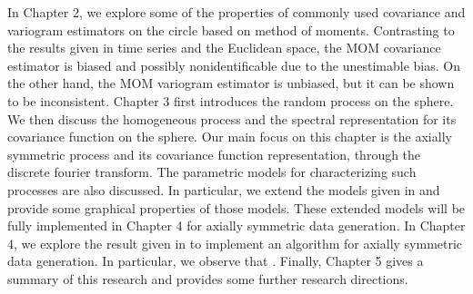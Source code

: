In Chapter 2, we explore some of the properties of commonly used covariance and variogram estimators on the circle based on method of moments. Contrasting to the results given in time series and the Euclidean space, the MOM covariance estimator is biased and possibly nonidentificable due to the unestimable bias. On the other hand, the MOM variogram estimator is unbiased, but it can be shown to be inconsistent. Chapter 3 first introduces the random process on the sphere. We then discuss the homogeneous process and the spectral representation for its covariance function on the sphere. Our main focus on this chapter is the axially symmetric process and its covariance function representation, through the discrete fourier transform. The parametric models for characterizing such processes are also discussed. In particular, we extend the models given in \cite{Huang2012} and provide some graphical properties of those models. These extended models will be fully implemented in Chapter 4 for axially symmetric data generation. In Chapter 4, we explore the result given in \cite{Huang2012} to implement an algorithm for axially symmetric data generation. In particular, we observe that . Finally, Chapter 5 gives a summary of this research and provides some further research directions.   




%
%
%
%			
%			
%			
%			
%			
%			
%			
%			
%			
%			
%			
%			
%
